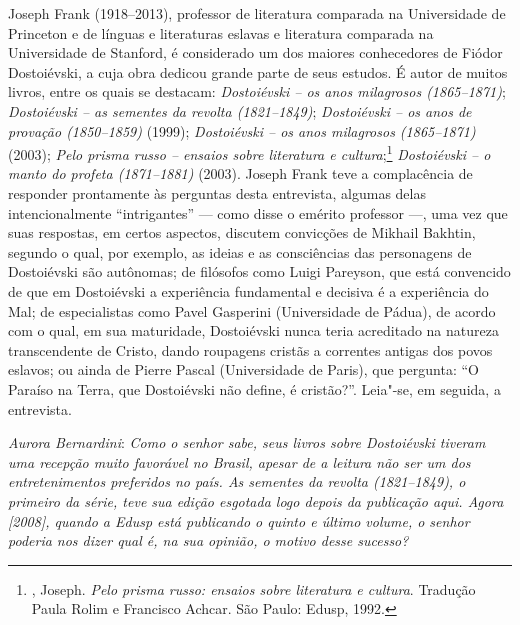 Joseph Frank (1918--2013), professor de literatura comparada na Universidade de
Princeton e de línguas e literaturas eslavas e literatura comparada na
Universidade de Stanford, é considerado um dos maiores conhecedores
de Fiódor Dostoiévski, a cuja obra dedicou grande parte de
seus estudos. É autor de muitos livros, entre
os quais se destacam: \emph{Dostoiévski -- os anos milagrosos (1865--1871)}; \emph{Dostoiévski -- as sementes da revolta (1821--1849)}; \emph{Dostoiévski -- os anos de provação
(1850--1859)} (1999); \emph{Dostoiévski -- os anos
milagrosos (1865--1871)} (2003); \emph{Pelo prisma russo -- ensaios sobre literatura e cultura};\footnote{, Joseph. \emph{Pelo prisma russo: ensaios sobre literatura e cultura}. Tradução Paula Rolim e Francisco Achcar. São Paulo: Edusp, 1992.} \emph{Dostoiévski -- o manto do
profeta (1871--1881)} (2003). Joseph
Frank teve a complacência de responder prontamente às perguntas desta
entrevista, algumas delas intencionalmente ``intrigantes'' --- como disse o
emérito professor ---, uma vez que suas respostas, em certos aspectos,
discutem convicções de Mikhail Bakhtin, segundo o qual, por exemplo, as
ideias e as consciências das personagens de Dostoiévski são autônomas; de filósofos
como Luigi Pareyson, que está convencido de que em Dostoiévski a
experiência fundamental e decisiva é a experiência do Mal; de
especialistas como Pavel Gasperini (Universidade de Pádua), de acordo
com o qual, em sua maturidade, Dostoiévski nunca teria acreditado na
natureza transcendente de Cristo, dando roupagens cristãs a correntes antigas dos povos eslavos; ou ainda de Pierre Pascal (Universidade de Paris), que pergunta: ``O Paraíso na Terra, que
Dostoiévski não define, é cristão?''. Leia"-se, em seguida, a entrevista.

\medskip

\noindent
\emph{Aurora Bernardini}: \emph{Como o senhor sabe, seus livros sobre Dostoiévski tiveram
uma recepção muito favorável no Brasil, apesar de a leitura não ser um
dos entretenimentos preferidos no país. \emph{As sementes da revolta
(1821--1849)}, o primeiro da série, teve sua edição esgotada logo depois da
publicação aqui. Agora [2008], quando a Edusp está publicando o quinto e último
volume, o senhor poderia nos dizer qual é, na sua opinião, o motivo
desse sucesso?}


